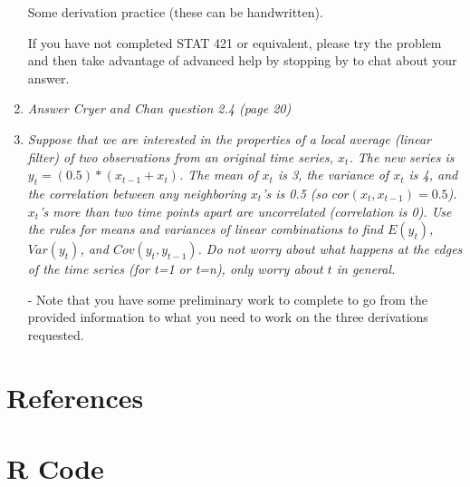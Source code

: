 \documentclass[11pt]{article}\usepackage[]{graphicx}\usepackage[]{color}
\begin{document}
\begin{enumerate}
\begin{center}
{\large \bf{Some derivation practice (these can be handwritten). 

If you have not completed STAT 421 or equivalent, please try the problem and then take advantage of advanced help by stopping by to chat about your answer.}}
\end{center}


\item%
{\it Answer Cryer and Chan question 2.4 (page 20)}


\item%
{\it Suppose that we are interested in the properties of a local average (linear filter) of two observations from an original time series, $x_t$. The new series is $y_t=(0.5)*(x_{t-1}+x_t)$. The mean of $x_t$ is 3, the variance of $x_t$ is 4, and the correlation between any neighboring $x_t$'s is 0.5 (so $cor(x_t, x_{t-1})=0.5$). $x_t$'s more than two time points apart are uncorrelated (correlation is 0). Use the rules for means and variances of linear combinations to find $E(y_t)$, $Var(y_t)$, and $Cov(y_t,y_{t-1})$. Do not worry about what happens at the edges of the time series (for t=1 or t=n), only worry about $t$ in general. 

  - Note that you have some preliminary work to complete to go from the provided information to what you need to work on the three derivations requested.}

\end{enumerate}

\section*{References}


\appendix
\section*{R Code}
\end{document}
